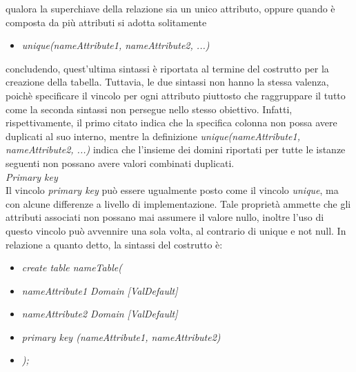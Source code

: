 \documentclass{article}
\begin{document}
qualora la superchiave della relazione sia un unico attributo, oppure quando è composta da più attributi si adotta solitamente
\begin{itemize}[label={ }, leftmargin=1cm]
    \item \textit{unique(nameAttribute1, nameAttribute2, ...)}
\end{itemize}
concludendo, quest'ultima sintassi è riportata al termine del costrutto per la creazione della tabella. Tuttavia, le due sintassi non hanno la stessa valenza, poichè specificare il vincolo per ogni attributo piuttosto che raggruppare il tutto come la seconda sintassi non persegue nello stesso obiettivo. Infatti, rispettivamente, il primo citato indica che la specifica colonna non possa avere duplicati al suo interno, mentre la definizione \textit{unique(nameAttribute1, nameAttribute2, ...)} indica che l'insieme dei domini riportati per tutte le istanze seguenti non possano avere valori combinati duplicati.\vspace*{14pt}\\
\textit{Primary key}\\Il vincolo \textit{primary key} può essere ugualmente posto come il vincolo \textit{unique}, ma con alcune differenze a livello di implementazione. Tale proprietà ammette che gli attributi associati non possano mai assumere il valore nullo, inoltre l'uso di questo vincolo può avvennire una sola volta, al contrario di unique e not null. In relazione a quanto detto, la sintassi del costrutto è:
\begin{itemize}[label={ }, leftmargin=1cm]
    \item \textit{create table nameTable(}
\end{itemize}
\begin{itemize}[label={ }, leftmargin=2cm]
    \itemsep0em
    \item \textit{nameAttribute1 Domain [ValDefault]}
    \item \textit{nameAttribute2 Domain [ValDefault]}
    \item \textit{primary key (nameAttribute1, nameAttribute2)}
\end{itemize}
\begin{itemize}[label={ }, leftmargin=1cm]
    \item \textit{);}
\end{itemize}
\end{document}
